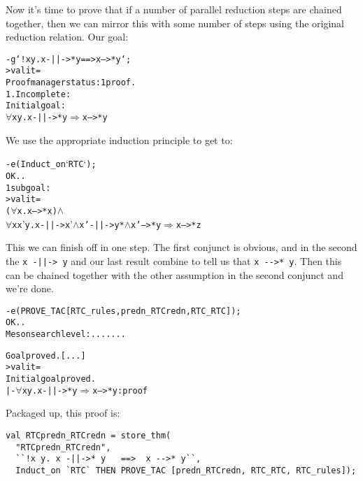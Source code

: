 Now it's time to prove that if a number of parallel reduction steps
are chained together, then we can mirror this with some number of
steps using the original reduction relation.  Our goal:
\begin{session}
\begin{alltt}
- g `!x y. x -||->* y  ==> x -->* y`;
> val it =
    Proof manager status: 1 proof.
    1. Incomplete:
         Initial goal:
         \(\forall\)x y. x -||->* y \(\Rightarrow\) x -->* y
\end{alltt}
\end{session}
We use the appropriate induction principle to get to:
\begin{session}
\begin{alltt}
- e (Induct_on `RTC`);
OK..
1 subgoal:
> val it =
    (\(\forall\)x. x -->* x) \(\land\)
    \(\forall\)x x' y. x -||-> x' \(\land\) x' -||-> y* \(\land\) x' -->* y \(\Rightarrow\) x -->* z
\end{alltt}
\end{session}
This we can finish off in one step.  The first conjunct is obvious,
and in the second the \verb!x -||-> y! and our last result combine to
tell us that \verb!x -->* y!.  Then this can be chained together with
the other assumption in the second conjunct and we're done.
\begin{session}
\begin{alltt}
- e (PROVE_TAC [RTC_rules, predn_RTCredn, RTC_RTC]);
OK..
Meson search level: .......

Goal proved.[...]
> val it =
    Initial goal proved.
    |- \(\forall\)x y. x -||->* y \(\Rightarrow\) x -->* y : proof
\end{alltt}
\end{session}
Packaged up, this proof is:
\begin{session}
\begin{verbatim}
val RTCpredn_RTCredn = store_thm(
  "RTCpredn_RTCredn",
  ``!x y. x -||->* y   ==>  x -->* y``,
  Induct_on `RTC` THEN PROVE_TAC [predn_RTCredn, RTC_RTC, RTC_rules]);
\end{verbatim}
\end{session}
\eos{}

